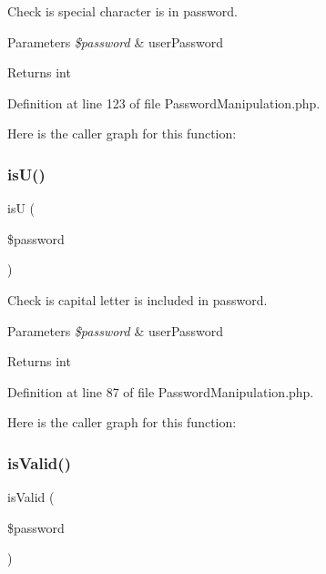 Check is special character is in password.


\begin{DoxyParams}{Parameters}
{\em \$password} & user\+Password\\
\hline
\end{DoxyParams}
\begin{DoxyReturn}{Returns}
int 
\end{DoxyReturn}


Definition at line 123 of file Password\+Manipulation.\+php.

Here is the caller graph for this function\+:
\mbox{\label{class_zest_1_1_common_1_1_password_manipulation_adfaa93e8974d5b4a0c211792c90c26d9}} 
\subsubsection{\texorpdfstring{is\+U()}{isU()}}
{\footnotesize\ttfamily isU (\begin{DoxyParamCaption}\item[{}]{\$password }\end{DoxyParamCaption})}

Check is capital letter is included in password.


\begin{DoxyParams}{Parameters}
{\em \$password} & user\+Password\\
\hline
\end{DoxyParams}
\begin{DoxyReturn}{Returns}
int 
\end{DoxyReturn}


Definition at line 87 of file Password\+Manipulation.\+php.

Here is the caller graph for this function\+:
\mbox{\label{class_zest_1_1_common_1_1_password_manipulation_ad425450552b15b347e37950309954338}} 
\subsubsection{\texorpdfstring{is\+Valid()}{isValid()}}
{\footnotesize\ttfamily is\+Valid (\begin{DoxyParamCaption}\item[{}]{\$password }\end{DoxyParamCaption})}


